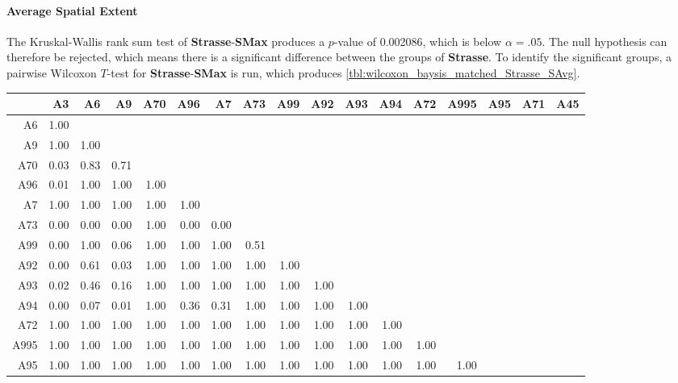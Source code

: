 \paragraph{Average Spatial Extent}
The Kruskal-Wallis rank sum test of \textbf{Strasse}-\textbf{SMax} produces a $p$-value of 0.002086, which is below $\alpha=.05$. The null hypothesis can therefore be rejected, which means there is a significant difference between the groups of \textbf{Strasse}. To identify the significant groups, a pairwise Wilcoxon $T$-test for \textbf{Strasse}-\textbf{SMax} is run, which produces \autoref{tbl:wilcoxon_baysis_matched_Strasse_SAvg}.
\begin{table}[ht]
	\tiny
	\setlength{\tabcolsep}{4pt}
	\centering
	\begin{tabular}{rrrrrrrrrrrrrrrrr}
		\toprule
	 	& A3 & A6 & A9 & A70 & A96 & A7 & A73 & A99 & A92 & A93 & A94 & A72 & A995 & A95 & A71 & A45 \\ 
		\midrule
		A6 & 1.00 &  &  &  &  &  &  &  &  &  &  &  &  &  &  &  \\ 
	  	A9 & 1.00 & 1.00 &  &  &  &  &  &  &  &  &  &  &  &  &  &  \\ 
	  	A70 & 0.03 & 0.83 & 0.71 &  &  &  &  &  &  &  &  &  &  &  &  &  \\ 
	  	A96 & 0.01 & 1.00 & 1.00 & 1.00 &  &  &  &  &  &  &  &  &  &  &  &  \\ 
	  	A7 & 1.00 & 1.00 & 1.00 & 1.00 & 1.00 &  &  &  &  &  &  &  &  &  &  &  \\ 
	  	A73 & 0.00 & 0.00 & 0.00 & 1.00 & 0.00 & 0.00 &  &  &  &  &  &  &  &  &  &  \\ 
	  	A99 & 0.00 & 1.00 & 0.06 & 1.00 & 1.00 & 1.00 & 0.51 &  &  &  &  &  &  &  &  &  \\ 
	  	A92 & 0.00 & 0.61 & 0.03 & 1.00 & 1.00 & 1.00 & 1.00 & 1.00 &  &  &  &  &  &  &  &  \\ 
	  	A93 & 0.02 & 0.46 & 0.16 & 1.00 & 1.00 & 1.00 & 1.00 & 1.00 & 1.00 &  &  &  &  &  &  &  \\ 
	  	A94 & 0.00 & 0.07 & 0.01 & 1.00 & 0.36 & 0.31 & 1.00 & 1.00 & 1.00 & 1.00 &  &  &  &  &  &  \\ 
	  	A72 & 1.00 & 1.00 & 1.00 & 1.00 & 1.00 & 1.00 & 1.00 & 1.00 & 1.00 & 1.00 & 1.00 &  &  &  &  &  \\ 
	  	A995 & 1.00 & 1.00 & 1.00 & 1.00 & 1.00 & 1.00 & 1.00 & 1.00 & 1.00 & 1.00 & 1.00 & 1.00 &  &  &  &  \\ 
	  	A95 & 1.00 & 1.00 & 1.00 & 1.00 & 1.00 & 1.00 & 1.00 & 1.00 & 1.00 & 1.00 & 1.00 & 1.00 & 1.00 &  &  &  \\ 

\end{tabular}
\end{table}

